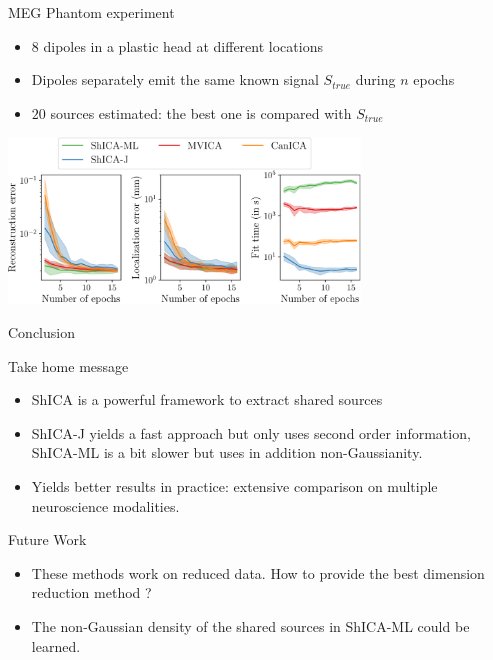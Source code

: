 \documentclass[bigger]{beamer}
\begin{document}
\begin{frame}
  \begin{block}{MEG Phantom experiment}
    \begin{itemize}
    \item 8 dipoles in a plastic head at different locations
    \item Dipoles separately emit the same known signal $S_{true}$ during $n$ epochs
    \item $20$ sources estimated: the best one is compared with $S_{true}$
    \end{itemize}
  \end{block}
  \begin{center}
    \includegraphics[width=0.7\textwidth]{./figures/meg_phantom_neurips.pdf}
  \end{center}
\end{frame}

\begin{frame}{Conclusion}
\begin{block}{Take home message}
\begin{itemize}
\item ShICA is a powerful framework to extract shared sources
\item ShICA-J yields a fast approach but only uses second order information,
  ShICA-ML is a bit slower but uses in addition non-Gaussianity.
\item Yields better results in practice: extensive comparison on multiple
  neuroscience modalities.
\end{itemize}
\end{block}

\begin{block}{Future Work}
\begin{itemize}
  \item These methods work on reduced data. How to provide the best dimension
    reduction method ?
  \item The non-Gaussian density of the shared sources in ShICA-ML could be learned.  
\end{itemize}
\end{block}
\end{frame}
\end{document}
